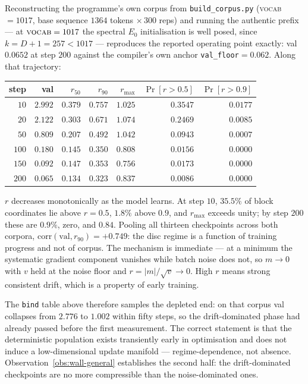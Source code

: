 Reconstructing the programme's own corpus from \texttt{build\_corpus.py}
(\textsc{vocab} $=1017$, base sequence $1364$ tokens $\times\,300$ reps) and
running the authentic prefix --- at $\textsc{vocab}=1017$ the spectral $E_0$
initialisation is well posed, since $k=D{+}1=257<1017$ --- reproduces the
reported operating point exactly: val $0.0652$ at step $200$ against the
compiler's own anchor \texttt{val\_floor}$=0.062$. Along that trajectory:

\begin{center}
\begin{tabular}{rrrrrrr}
\hline
step & val & $r_{50}$ & $r_{90}$ & $r_{\max}$ & $\Pr[r>0.5]$ & $\Pr[r>0.9]$ \\
\hline
$10$  & $2.992$ & $0.379$ & $0.757$ & $1.025$ & $0.3547$ & $0.0177$ \\
$20$  & $2.122$ & $0.303$ & $0.671$ & $1.074$ & $0.2469$ & $0.0085$ \\
$50$  & $0.809$ & $0.207$ & $0.492$ & $1.042$ & $0.0943$ & $0.0007$ \\
$100$ & $0.180$ & $0.145$ & $0.350$ & $0.808$ & $0.0156$ & $0.0000$ \\
$150$ & $0.092$ & $0.147$ & $0.353$ & $0.756$ & $0.0173$ & $0.0000$ \\
$200$ & $0.065$ & $0.134$ & $0.323$ & $0.837$ & $0.0086$ & $0.0000$ \\
\hline
\end{tabular}
\end{center}

\begin{observation}
\label{obs:regime-negative}
$r$ decreases monotonically as the model learns. At step $10$, $35.5\%$ of
block coordinates lie above $r=0.5$, $1.8\%$ above $0.9$, and $r_{\max}$
exceeds unity; by step $200$ these are $0.9\%$, zero, and $0.84$. Pooling all
thirteen checkpoints across both corpora, $\mathrm{corr}(\text{val},r_{90})
= +0.749$: the disc regime is a function of training progress and not of
corpus. The mechanism is immediate --- at a minimum the systematic gradient
component vanishes while batch noise does not, so $m\to0$ with $v$ held at the
noise floor and $r=|m|/\sqrt{v}\to0$. High $r$ means strong consistent drift,
which is a property of early training.
\end{observation}

The \texttt{bind} table above therefore samples the depleted end: on that
corpus val collapses from $2.776$ to $1.002$ within fifty steps, so the
drift-dominated phase had already passed before the first measurement. The
correct statement is that the deterministic population exists transiently early
in optimisation and does not induce a low-dimensional update manifold ---
regime-dependence, not absence. Observation~\ref{obs:wall-general} establishes
the second half: the drift-dominated checkpoints are no more compressible than
the noise-dominated ones.

